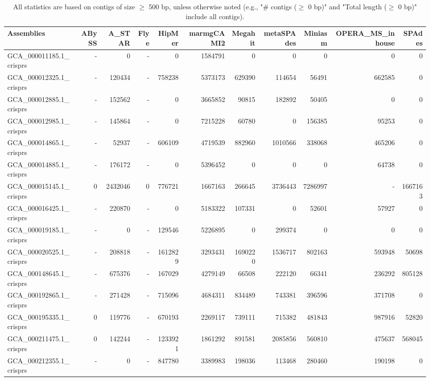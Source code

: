 \documentclass[12pt,a4paper]{article}
\begin{document}
\begin{table}[ht]
\begin{center}
\caption{All statistics are based on contigs of size $\geq$ 500 bp, unless otherwise noted (e.g., "\# contigs ($\geq$ 0 bp)" and "Total length ($\geq$ 0 bp)" include all contigs).}
\begin{tabular}{|l*{10}{|r}|}
\hline
Assemblies & ABySS & A\_STAR & Flye & HipMer & marmgCAMI2 & Megahit & metaSPAdes & Miniasm & OPERA\_MS\_inhouse & SPAdes \\ \hline
GCA\_000011185.1\_crisprs & - & 0 & - & 0 & 1584791 & 0 & 0 & 0 & 0 & 0 \\ \hline
GCA\_000012325.1\_crisprs & - & 120434 & - & 758238 & 5373173 & 629390 & 114654 & 56491 & 662585 & 0 \\ \hline
GCA\_000012885.1\_crisprs & - & 152562 & - & 0 & 3665852 & 90815 & 182892 & 50405 & 0 & 0 \\ \hline
GCA\_000012985.1\_crisprs & - & 145864 & - & 0 & 7215228 & 60780 & 0 & 156385 & 95253 & 0 \\ \hline
GCA\_000014865.1\_crisprs & - & 52937 & - & 606109 & 4719539 & 882960 & 1010566 & 338068 & 465206 & 0 \\ \hline
GCA\_000014885.1\_crisprs & - & 176172 & - & 0 & 5396452 & 0 & 0 & 0 & 64738 & 0 \\ \hline
GCA\_000015145.1\_crisprs & 0 & 2432046 & 0 & 776721 & 1667163 & 266645 & 3736443 & 7286997 & - & 1667163 \\ \hline
GCA\_000016425.1\_crisprs & - & 220870 & - & 0 & 5183322 & 107331 & 0 & 52601 & 57927 & 0 \\ \hline
GCA\_000019185.1\_crisprs & - & 0 & - & 129546 & 5226895 & 0 & 299374 & 0 & 0 & 0 \\ \hline
GCA\_000020525.1\_crisprs & - & 208818 & - & 1612829 & 3293431 & 1690220 & 1536717 & 802163 & 593948 & 50698 \\ \hline
GCA\_000148645.1\_crisprs & - & 675376 & - & 167029 & 4279149 & 66508 & 222120 & 66341 & 236292 & 805128 \\ \hline
GCA\_000192865.1\_crisprs & - & 271428 & - & 715096 & 4684311 & 834489 & 743381 & 396596 & 371708 & 0 \\ \hline
GCA\_000195335.1\_crisprs & 0 & 119776 & - & 670193 & 2269117 & 739111 & 715382 & 481843 & 987916 & 52820 \\ \hline
GCA\_000211475.1\_crisprs & 0 & 142244 & - & 1233921 & 1861292 & 891581 & 2085856 & 560810 & 475637 & 568045 \\ \hline
GCA\_000212355.1\_crisprs & - & 0 & - & 847780 & 3389983 & 198036 & 113468 & 280460 & 190198 & 0 \\ \hline

\end{tabular}
\end{center}
\end{table}
\end{document}
